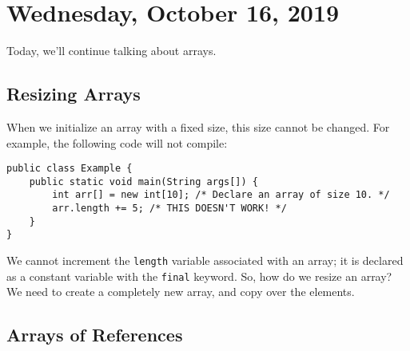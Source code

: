 \section{Wednesday, October 16, 2019}

Today, we'll continue talking about arrays.

\subsection{Resizing Arrays}

When we initialize an array with a fixed size, this size cannot be changed. For example, the following code will not compile:

\begin{lstlisting}
public class Example {
    public static void main(String args[]) {
        int arr[] = new int[10]; /* Declare an array of size 10. */
        arr.length += 5; /* THIS DOESN'T WORK! */
    }
}
\end{lstlisting}

We cannot increment the \verb!length! variable associated with an array; it is declared as a constant variable with the \verb!final! keyword. So, how do we resize an array? We need to create a completely new array, and copy over the elements. 

\subsection{Arrays of References}

